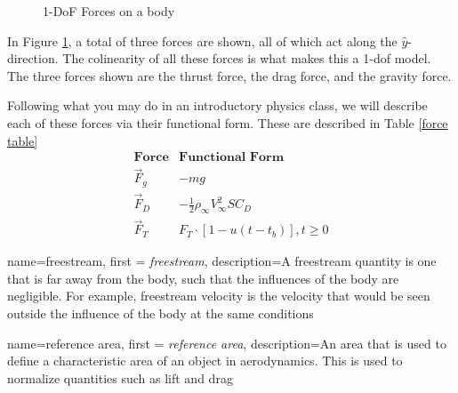 \documentclass[12pt]{report}
\begin{document}
\begin{figure}[ht]
    \caption{1-DoF Forces on a body}
    \label{fig: 1DoF forces}
\end{figure}

In Figure \ref{fig: 1DoF forces}, a total of three forces are shown, all of which act along the $\hat{y}$-direction. The colinearity of all these forces is what makes this a 1-\gls{dof} model. The three forces shown are the thrust force, the drag force, and the gravity force.

Following what you may do in an introductory physics class, we will describe each of these forces via their functional form. These are described in Table \ref{force table}
$$
\begin{array}{cc}\label{force table}
    \mathrm{\textbf{Force}}&\mathrm{\textbf{Functional Form}}\\
    \vec{F}_g &  -mg\\
     \vec{F}_D& -\frac{1}{2} \rho_{\infty} V^2_{\infty}SC_D\\
     \vec{F}_T & F_T\cdot[1-u(t-t_b)], t\ge0
\end{array}
$$

{
    name=freestream,
    first = {\textit{freestream}},
    description={A freestream quantity is one that is far away from the body, such that the influences of the body are negligible. For example, \gls{freestream} velocity is the velocity that would be seen outside the influence of the body at the same conditions}
}

{
    name=reference area,
    first = \textit{reference area},
    description={An area that is used to define a characteristic area of an object in aerodynamics. This is used to normalize quantities such as lift and drag}
    }
\end{document}
